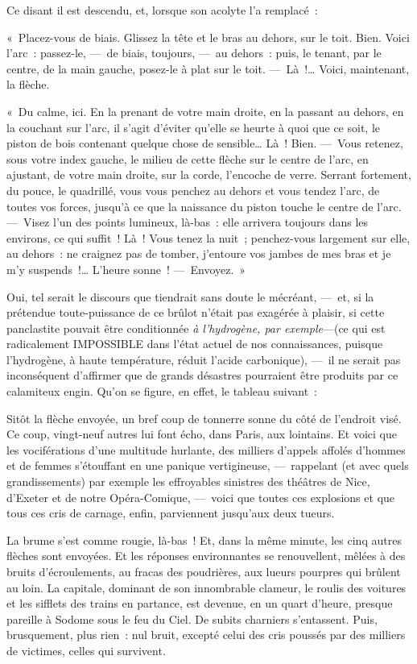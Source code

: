\documentclass[french,twoside]{book} %
\begin{document}
Ce disant il est descendu, et, lorsque son acolyte l’a remplacé :\par
« Placez-vous de biais. Glissez la tête et le bras au dehors, sur le toit. Bien. Voici l’arc : passez-le, — de biais, toujours, — au dehors : puis, le tenant, par le centre, de la main gauche, posez-le à plat sur le toit. — Là !… Voici, maintenant, la flèche.\par
« Du calme, ici. En la prenant de votre main droite, en la passant au dehors, en la couchant sur l’arc, il s’agit d’éviter qu’elle se heurte à quoi que ce soit, le piston de bois contenant quelque chose de sensible… Là ! Bien. — Vous retenez, sous votre index gauche, le milieu de cette flèche sur le centre de l’arc, en ajustant, de votre main droite, sur la corde, l’encoche de verre. Serrant fortement, du pouce, le quadrillé, vous vous penchez au dehors et vous   tendez l’arc, de toutes vos forces, jusqu’à ce que la naissance du piston touche le centre de l’arc. — Visez l’un des points lumineux, là-bas : elle arrivera toujours dans les environs, ce qui suffit ! Là ! Vous tenez la nuit ; penchez-vous largement sur elle, au dehors : ne craignez pas de tomber, j’entoure vos jambes de mes bras et je m’y suspends !… L’heure sonne ! — Envoyez. »\par
Oui, tel serait le discours que tiendrait sans doute le mécréant, — et, si la prétendue toute-puissance de ce brûlot n’était pas exagérée à plaisir, si cette panclastite pouvait être conditionnée \emph{à l’hydrogène, par exemple}—(ce qui est radicalement IMPOSSIBLE dans l’état actuel de nos connaissances, puisque l’hydrogène, à haute température, réduit l’acide carbonique), — il ne serait pas inconséquent d’affirmer que de grands désastres pourraient être produits par ce calamiteux engin. Qu’on se figure, en effet, le tableau suivant :\par
   Sitôt la flèche envoyée, un bref coup de tonnerre sonne du côté de l’endroit visé. Ce coup, vingt-neuf autres lui font écho, dans Paris, aux lointains. Et voici que les vociférations d’une multitude hurlante, des milliers d’appels affolés d’hommes et de femmes s’étouffant en une panique vertigineuse, — rappelant (et avec quels grandissements) par exemple les effroyables sinistres des théâtres de Nice, d’Exeter et de notre Opéra-Comique, — voici que toutes ces explosions et que tous ces cris de carnage, enfin, parviennent jusqu’aux deux tueurs.\par
La brume s’est comme rougie, là-bas ! Et, dans la même minute, les cinq autres flèches sont envoyées. Et les réponses environnantes se renouvellent, mêlées à des bruits d’écroulements, au fracas des poudrières, aux lueurs pourpres qui brûlent au loin. La capitale, dominant de son innombrable clameur, le roulis des voitures et les sifflets des trains en partance, est devenue, en un quart d’heure, presque pareille à Sodome sous le feu du Ciel. De subits charniers s’entassent. Puis, brusquement, plus rien : nul bruit,   excepté celui des cris poussés par des milliers de victimes, celles qui survivent.\par
\end{document}
